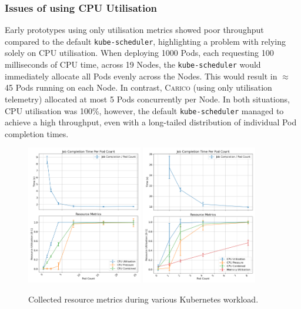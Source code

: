 \subsubsection{Issues of using CPU Utilisation}
\label{sec:issue-with-util}
Early prototypes using only utilisation metrics showed poor throughput compared
to the default \verb|kube-scheduler|, highlighting a problem with relying solely
on CPU utilisation. When deploying 1000 Pods, each requesting 100 milliseconds
of CPU time, across 19 Nodes, the \verb|kube-scheduler| would immediately
allocate all Pods evenly across the Nodes. This would result in $\approx$ 45
Pods running on each Node. In contrast, \textsc{Carico} (using only utilisation
telemetry) allocated at most 5 Pods concurrently per Node. In both situations,
CPU utilisation was 100\%, however, the default \verb|kube-scheduler| managed to
achieve a high throughput, even with a long-tailed distribution of individual
Pod completion times.

\begin{figure}[H]
    \centering
    \includegraphics[width=0.45\textwidth]{images/podcount-util-pressure.png}
    \includegraphics[width=0.45\textwidth]{images/ml-podcount-util-pressure.png}
    \caption{Collected resource metrics during various Kubernetes workload.}
    \label{fig:podcount-util-pressure}
\end{figure}

